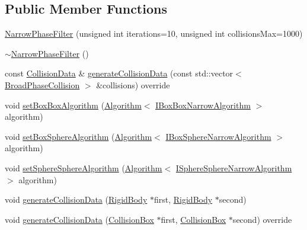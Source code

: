 \subsection*{Public Member Functions}
\begin{DoxyCompactItemize}
\item 
\mbox{\hyperlink{classrum_1_1_narrow_phase_filter_a39c93f6384868ade8b9ee8f09cfef270}{Narrow\+Phase\+Filter}} (unsigned int iterations=10, unsigned int collisions\+Max=1000)
\item 
\mbox{\hyperlink{classrum_1_1_narrow_phase_filter_ac63ac2b2ec6460c6212f06d875cae328}{$\sim$\+Narrow\+Phase\+Filter}} ()
\item 
const \mbox{\hyperlink{classrum_1_1_collision_data}{Collision\+Data}} \& \mbox{\hyperlink{classrum_1_1_narrow_phase_filter_a3c31b3e4ec6b2c1a1c104ac734be686c}{generate\+Collision\+Data}} (const std\+::vector$<$ \mbox{\hyperlink{structrum_1_1_broad_phase_collision}{Broad\+Phase\+Collision}} $>$ \&collisions) override
\item 
void \mbox{\hyperlink{classrum_1_1_narrow_phase_filter_a888f91e93de3ee05bcf0811a7d39ea2c}{set\+Box\+Box\+Algorithm}} (\mbox{\hyperlink{classrum_1_1_narrow_phase_filter_a499acd63e16f164dbf1ee7567c1a3e0f}{Algorithm}}$<$ \mbox{\hyperlink{classrum_1_1_i_box_box_narrow_algorithm}{I\+Box\+Box\+Narrow\+Algorithm}} $>$ algorithm)
\item 
void \mbox{\hyperlink{classrum_1_1_narrow_phase_filter_a2420746ba108a35b3f06f7b351abfa5f}{set\+Box\+Sphere\+Algorithm}} (\mbox{\hyperlink{classrum_1_1_narrow_phase_filter_a499acd63e16f164dbf1ee7567c1a3e0f}{Algorithm}}$<$ \mbox{\hyperlink{classrum_1_1_i_box_sphere_narrow_algorithm}{I\+Box\+Sphere\+Narrow\+Algorithm}} $>$ algorithm)
\item 
void \mbox{\hyperlink{classrum_1_1_narrow_phase_filter_ad29d02d2db07f650a60e97771b05f325}{set\+Sphere\+Sphere\+Algorithm}} (\mbox{\hyperlink{classrum_1_1_narrow_phase_filter_a499acd63e16f164dbf1ee7567c1a3e0f}{Algorithm}}$<$ \mbox{\hyperlink{classrum_1_1_i_sphere_sphere_narrow_algorithm}{I\+Sphere\+Sphere\+Narrow\+Algorithm}} $>$ algorithm)
\item 
void \mbox{\hyperlink{classrum_1_1_narrow_phase_filter_a02edd873c8c7711aa3ef6249cae6ca1e}{generate\+Collision\+Data}} (\mbox{\hyperlink{classrum_1_1_rigid_body}{Rigid\+Body}} $\ast$first, \mbox{\hyperlink{classrum_1_1_rigid_body}{Rigid\+Body}} $\ast$second)
\item 
void \mbox{\hyperlink{classrum_1_1_narrow_phase_filter_ab72aba07867b2cbe21bd7f046f9a5e77}{generate\+Collision\+Data}} (\mbox{\hyperlink{classrum_1_1_collision_box}{Collision\+Box}} $\ast$first, \mbox{\hyperlink{classrum_1_1_collision_box}{Collision\+Box}} $\ast$second) override

\end{DoxyCompactItemize}
